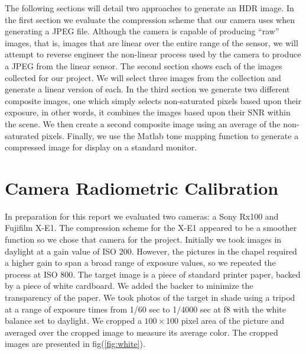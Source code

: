 \documentclass[a4paper]{article}
\begin{document}
The following sections will detail two approaches to generate an HDR image.  In the first section we evaluate the compression scheme that our camera uses when generating a JPEG file.  Although the camera is capable of producing ``raw'' images, that is, images that are linear over the entire range of the sensor, we will attempt to reverse engineer the non-linear process used by the camera to produce  a JPEG from the linear sensor.  The second section shows each of the images collected for our project.  We will select three images from the collection and generate a linear version of each. In the third section we generate two different composite images, one which simply selects non-saturated pixels based upon their exposure, in other words, it combines the images based upon their SNR within the  scene.  We then create a second composite image using an average of the non-saturated pixels.  Finally, we use the Matlab tone mapping function to generate a compressed image for display on a standard monitor. 
\section{Camera Radiometric Calibration}
In preparation for this report we evaluated two cameras: a Sony Rx100 and  Fujifilm X-E1.  The compression scheme for the X-E1 appeared to be a smoother function so we chose that camera for the project.  Initially we took images in daylight at a gain value of ISO 200.  However, the pictures in the chapel required a higher gain to span a broad range of exposure values, so we repeated the process at ISO 800.  The target image is a piece of standard printer paper, backed by a piece of white cardboard. We added the backer to minimize the transparency of the paper.  We took photos of the target in shade using a tripod at a range of exposure times from 1/60 sec to 1/4000 sec at f8 with the white balance set to daylight. We cropped a $100 \times 100$ pixel area of the picture and averaged over the cropped image to measure its average color.  The cropped images are presented in fig(\ref{fig:white}). 
\end{document}
